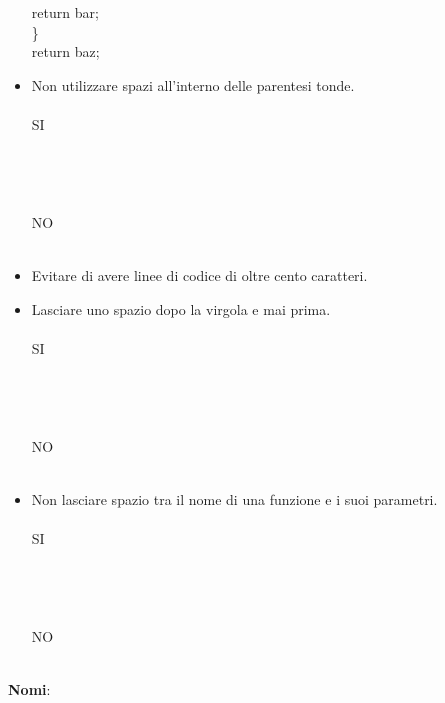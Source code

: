 \begin{itemize}
{{    \hspace*{0,3cm}return bar;\\
      \}\\
      return baz;}}
    \item Non utilizzare spazi all'interno delle parentesi tonde.\\ \\
    SI\\ \\ \\ \\ \\
    NO\\ \\ 
    \item Evitare di avere linee di codice di oltre cento caratteri.
    \item Lasciare uno spazio dopo la virgola e mai prima.\\ \\
    SI\\ \\ \\ \\ \\
    NO\\ \\ 
    \item Non lasciare spazio tra il nome di una funzione e i suoi parametri.\\ \\
    SI\\ \\ \\ \\ \\
    NO\\ \\ 
\end{itemize}
\textbf{Nomi}:
